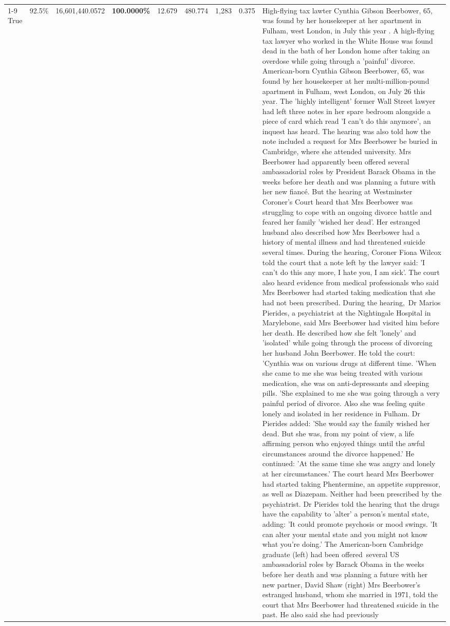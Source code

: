 \begin{table}[H]
\begin{tabular}{lllrlllll}
\cline{1-9}
True & 92.5\% & 16,601,440.0572 & \bfseries \color{red} 100.0000\% & 12.679 & 480.774 & 1,283 & 0.375 & High-flying tax lawter Cynthia Gibson Beerbower, 65, was found by her housekeeper at her apartment in Fulham, west London, in July this year . A high-flying tax lawyer who worked in the White House was found dead in the bath of her London home after taking an overdose while going through a 'painful' divorce. American-born Cynthia Gibson Beerbower, 65, was found by her housekeeper at her multi-million-pound apartment in Fulham, west London, on July 26 this year. The 'highly intelligent' former Wall Street lawyer had left three notes in her spare bedroom alongside a piece of card which read 'I can't do this anymore', an inquest has heard. The hearing was also told how the note included a request for Mrs Beerbower be buried in Cambridge, where she attended university. Mrs Beerbower had apparently been offered several ambassadorial roles by President Barack Obama in the weeks before her death and was planning a future with her new fiancé. But the hearing at Westminster Coroner's Court heard that Mrs Beerbower was struggling to cope with an ongoing divorce battle and feared her family 'wished her dead'. Her estranged husband also described how Mrs Beerbower had a history of mental illness and had threatened suicide several times. During the hearing, Coroner Fiona Wilcox told the court that a note left by the lawyer said: 'I can't do this any more, I hate you, I am sick'. The court also heard evidence from medical professionals who said Mrs Beerbower had started taking medication that she had not been prescribed. During the hearing, Dr Marios Pierides, a psychiatrist at the Nightingale Hospital in Marylebone, said Mrs Beerbower had visited him before her death. He described how she felt 'lonely' and 'isolated' while going through the process of divorcing her husband John Beerbower. He told the court: 'Cynthia was on various drugs at different time. 'When she came to me she was being treated with various medication, she was on anti-depressants and sleeping pills. 'She explained to me she was going through a very painful period of divorce. Also she was feeling quite lonely and isolated in her residence in Fulham. Dr Pierides added: 'She would say the family wished her dead. But she was, from my point of view, a life affirming person who enjoyed things until the awful circumstances around the divorce happened.' He continued: 'At the same time she was angry and lonely at her circumstances.' The court heard Mrs Beerbower had started taking Phentermine, an appetite suppressor, as well as Diazepam. Neither had been prescribed by the psychiatrist. Dr Pierides told the hearing that the drugs have the capability to 'alter' a person's mental state, adding: 'It could promote psychosis or mood swings. 'It can alter your mental state and you might not know what you're doing.' The American-born Cambridge graduate (left) had been offered several US ambassadorial roles by Barack Obama in the weeks before her death and was planning a future with her new partner, David Shaw (right) Mrs Beerbower's estranged husband, whom she married in 1971, told the court that Mrs Beerbower had threatened suicide in the past. He also said she had previously 
\end{tabular}
\end{table}
